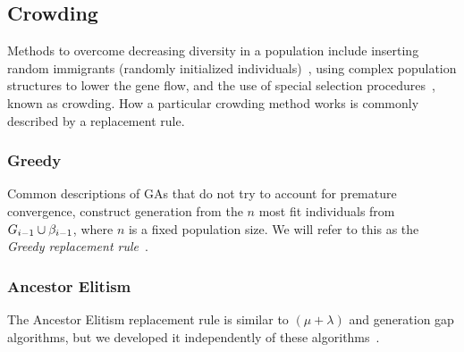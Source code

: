 \subsection{Crowding}\label{sec:replacementrules}
Methods to overcome decreasing diversity in a population include inserting random immigrants (randomly initialized individuals)~\cite{Cobb93geneticalgorithms}, using complex population structures to lower the gene flow, and the use of special selection procedures~\cite{ursem2002diversity, DeJong:1975:ABC:907087}, known as crowding. How a particular crowding method works is commonly described by a replacement rule.

\subsubsection{Greedy}
Common descriptions of GAs that do not try to account for premature convergence,
construct generation  from the $n$ most fit individuals from $G_{i-1} \cup \beta_{i-1}$, where $n$ is a fixed population size. We will refer to this as the \emph{Greedy replacement rule}~\cite{masterThesisGANN}.


%

\subsubsection{Ancestor Elitism}
The Ancestor Elitism replacement rule is similar to $\left(\mu + \lambda\right)$ and generation gap algorithms, but we developed it independently of these algorithms~\cite[p.\ 34, p.\ 50]{Luke2013Metaheuristics}.

